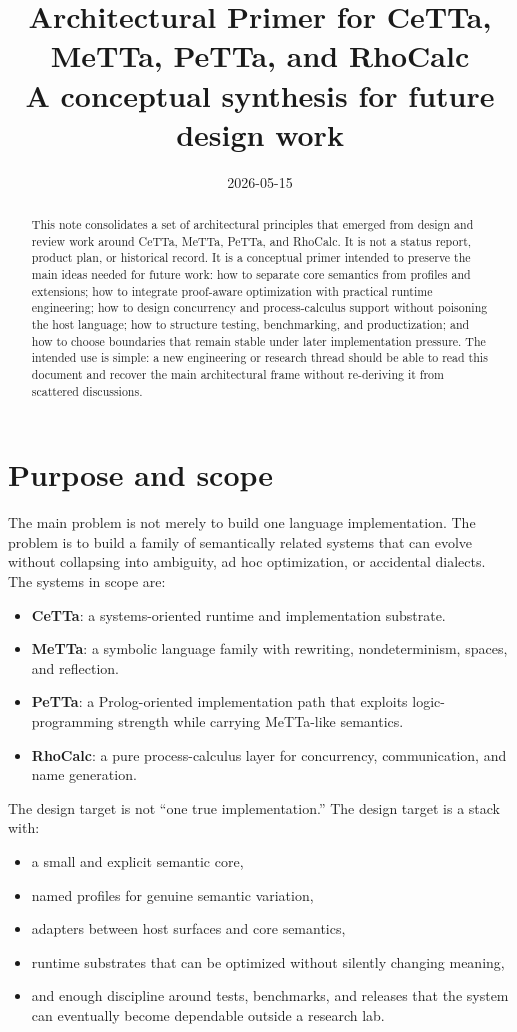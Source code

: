 \documentclass[11pt]{article}
\title{Architectural Primer for CeTTa, MeTTa, PeTTa, and RhoCalc\\\large A conceptual synthesis for future design work}
\author{}
\date{2026-05-15}
\begin{document}
\maketitle
\begin{abstract}
This note consolidates a set of architectural principles that emerged from design and review work around CeTTa, MeTTa, PeTTa, and RhoCalc. It is not a status report, product plan, or historical record. It is a conceptual primer intended to preserve the main ideas needed for future work: how to separate core semantics from profiles and extensions; how to integrate proof-aware optimization with practical runtime engineering; how to design concurrency and process-calculus support without poisoning the host language; how to structure testing, benchmarking, and productization; and how to choose boundaries that remain stable under later implementation pressure. The intended use is simple: a new engineering or research thread should be able to read this document and recover the main architectural frame without re-deriving it from scattered discussions.
\end{abstract}

\tableofcontents
\bigskip

\section{Purpose and scope}
The main problem is not merely to build one language implementation. The problem is to build a family of semantically related systems that can evolve without collapsing into ambiguity, ad hoc optimization, or accidental dialects. The systems in scope are:
\begin{itemize}
  \item \textbf{CeTTa}: a systems-oriented runtime and implementation substrate.
  \item \textbf{MeTTa}: a symbolic language family with rewriting, nondeterminism, spaces, and reflection.
  \item \textbf{PeTTa}: a Prolog-oriented implementation path that exploits logic-programming strength while carrying MeTTa-like semantics.
  \item \textbf{RhoCalc}: a pure process-calculus layer for concurrency, communication, and name generation.
\end{itemize}

The design target is not ``one true implementation.'' The design target is a stack with:
\begin{itemize}
  \item a small and explicit semantic core,
  \item named profiles for genuine semantic variation,
  \item adapters between host surfaces and core semantics,
  \item runtime substrates that can be optimized without silently changing meaning,
  \item and enough discipline around tests, benchmarks, and releases that the system can eventually become dependable outside a research lab.
\end{itemize}
\end{document}
